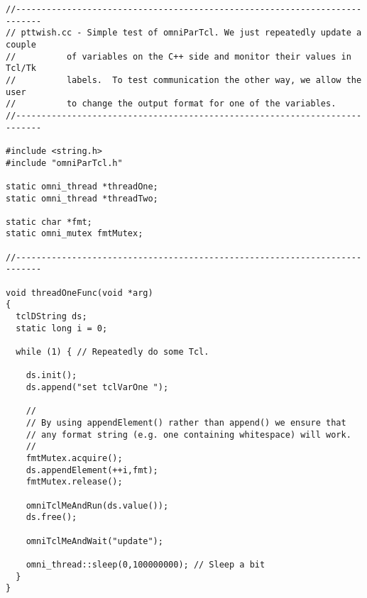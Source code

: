 \documentclass[11pt]{article}
\begin{document}
\newpage
\begin{verbatim}
//---------------------------------------------------------------------------
// pttwish.cc - Simple test of omniParTcl. We just repeatedly update a couple
//          of variables on the C++ side and monitor their values in Tcl/Tk 
//          labels.  To test communication the other way, we allow the user 
//          to change the output format for one of the variables.
//---------------------------------------------------------------------------

#include <string.h>
#include "omniParTcl.h"

static omni_thread *threadOne;
static omni_thread *threadTwo;

static char *fmt;
static omni_mutex fmtMutex;

//---------------------------------------------------------------------------

void threadOneFunc(void *arg)
{
  tclDString ds;
  static long i = 0;
  
  while (1) { // Repeatedly do some Tcl.
      
    ds.init();
    ds.append("set tclVarOne ");

    //
    // By using appendElement() rather than append() we ensure that
    // any format string (e.g. one containing whitespace) will work.
    //
    fmtMutex.acquire();
    ds.appendElement(++i,fmt);      
    fmtMutex.release();    
    
    omniTclMeAndRun(ds.value());
    ds.free();
      
    omniTclMeAndWait("update");
    
    omni_thread::sleep(0,100000000); // Sleep a bit
  }
}
\end{verbatim}
\newpage
\end{document}
